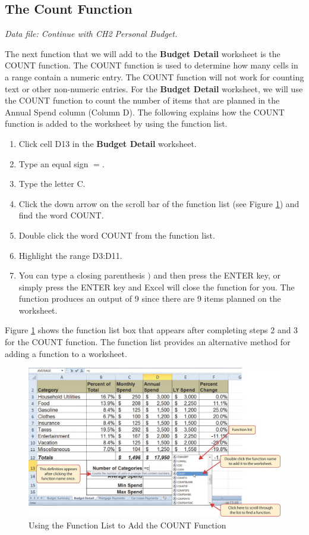 \subsection{The Count Function}

\textit{Data file: Continue with CH2 Personal Budget.}

The next function that we will add to the \textbf{Budget Detail} worksheet is the COUNT function. The COUNT function is used to determine how many cells in a range contain a numeric entry. The COUNT function will not work for counting text or other non-numeric entries. For the \textbf{Budget Detail} worksheet, we will use the COUNT function to count the number of items that are planned in the Annual Spend column (Column D). The following explains how the COUNT function is added to the worksheet by using the function list.

\begin{enumerate}
	\item Click cell \textsf{D13} in the \textbf{Budget Detail} worksheet.
	\item Type an equal sign $ = $.
	\item Type the letter C.
	\item Click the down arrow on the scroll bar of the function list (see Figure \ref{02:fig17}) and find the word COUNT.
	\item Double click the word COUNT from the function list.
	\item Highlight the range \textsf{D3:D11}.
	\item You can type a closing parenthesis $ ) $ and then press the ENTER key, or simply press the ENTER key and Excel will close the function for you. The function produces an output of 9 since there are 9 items planned on the worksheet.
\end{enumerate}

Figure \ref{02:fig17} shows the function list box that appears after completing steps 2 and 3 for the COUNT function. The function list provides an alternative method for adding a function to a worksheet.

\begin{figure}[H]
	\centering
	\includegraphics[width=\maxwidth{.95\linewidth}]{gfx/ch02_fig17}
	\caption{Using the Function List to Add the COUNT Function}
	\label{02:fig17}
\end{figure}

